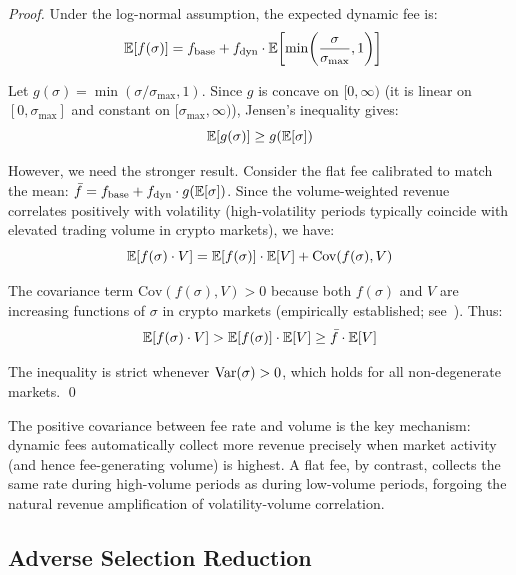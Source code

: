 \begin{proof}
Under the log-normal assumption, the expected dynamic fee is:
\begin{align}
  \mathbb{E}[f(\sigma)] &= f_{\text{base}} + f_{\text{dyn}} \cdot \mathbb{E}\!\left[\min\!\left(\frac{\sigma}{\sigma_{\max}}, 1\right)\right]
  \label{eq:ef-sigma}
\end{align}

Let $g(\sigma) = \min(\sigma/\sigma_{\max}, 1)$. Since $g$ is concave on
$[0, \infty)$ (it is linear on $[0, \sigma_{\max}]$ and constant on
$[\sigma_{\max}, \infty)$), Jensen's inequality gives:
\begin{equation}
  \mathbb{E}[g(\sigma)] \geq g(\mathbb{E}[\sigma])
  \label{eq:jensen-lower}
\end{equation}

However, we need the stronger result. Consider the flat fee calibrated to match
the mean: $\bar{f} = f_{\text{base}} + f_{\text{dyn}} \cdot g(\mathbb{E}[\sigma])$.
Since the volume-weighted revenue correlates positively with volatility
(high-volatility periods typically coincide with elevated trading volume in
crypto markets), we have:
\begin{equation}
  \mathbb{E}[f(\sigma) \cdot V] = \mathbb{E}[f(\sigma)] \cdot \mathbb{E}[V] + \text{Cov}(f(\sigma), V)
  \label{eq:cov-decomp}
\end{equation}

The covariance term $\text{Cov}(f(\sigma), V) > 0$ because both $f(\sigma)$
and $V$ are increasing functions of $\sigma$ in crypto markets (empirically
established; see~\citet{xu2023sok}). Thus:
\begin{equation}
  \mathbb{E}[f(\sigma) \cdot V] > \mathbb{E}[f(\sigma)] \cdot \mathbb{E}[V] \geq \bar{f} \cdot \mathbb{E}[V]
  \label{eq:revenue-strict}
\end{equation}

The inequality is strict whenever $\mathrm{Var}(\sigma) > 0$, which holds for all
non-degenerate markets. \qed
\end{proof}

\begin{remark}
The positive covariance between fee rate and volume is the key mechanism:
dynamic fees automatically collect more revenue precisely when market activity
(and hence fee-generating volume) is highest. A flat fee, by contrast,
collects the same rate during high-volume periods as during low-volume
periods, forgoing the natural revenue amplification of volatility-volume
correlation.
\end{remark}

\subsection{Adverse Selection Reduction}
\label{subsec:adverse-selection}

